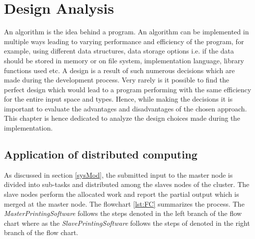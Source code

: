 \chapter{Design Analysis}
An algorithm is the idea behind a program. An algorithm can be implemented in multiple ways leading to varying performance and efficiency of the program, for example, using different data structures, data storage options i.e. if the data should be stored in memory or on file system, implementation language, library functions used etc. A design is a result of such numerous decisions which are made during the development process.  Very rarely is it possible to find the perfect design which would lead to a program performing with the same efficiency for the entire input space and types. Hence, while making the decisions it is important to evaluate the advantages and disadvantages of the chosen approach. This chapter is hence dedicated to analyze the design choices made during the implementation. 

\section{Application of distributed computing}

As discussed in section \ref{sysMod}, the submitted input to the master node is divided into sub-tasks and distributed among the slaves nodes of the cluster.
The slave nodes perform the allocated work and report the partial output which is merged at the master node. The flowchart \ref{lst:FC} summarizes the process.
The \textit{MasterPrintingSoftware} follows the steps denoted in the left branch of the flow chart where as the \textit{SlavePrintingSoftware} follows the steps of denoted in the right branch of the flow chart. 

